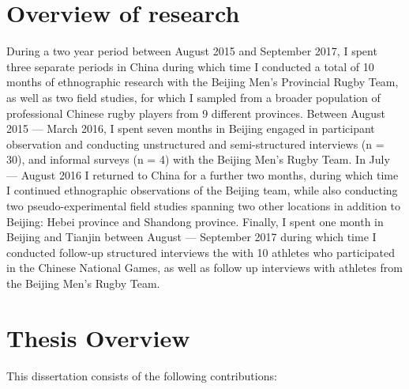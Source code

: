 \section{Overview of research}
During a two year period between August 2015 and September 2017, I spent three separate periods in China during which time I conducted a total of 10 months of ethnographic research with the Beijing Men's Provincial Rugby Team, as well as two field studies, for which I sampled from a broader population of professional Chinese rugby players from 9 different provinces.  Between August 2015 --- March 2016, I spent seven months in Beijing engaged in participant observation and conducting unstructured and semi-structured interviews (n = 30), and informal surveys (n = 4) with the Beijing Men's Rugby Team.  In July --- August 2016 I returned to China for a further two months, during which time I continued ethnographic observations of the Beijing team, while also conducting two pseudo-experimental field studies spanning two other locations in addition to Beijing: Hebei province and Shandong province.  Finally, I spent one month in Beijing and Tianjin between August --- September 2017 during which time I conducted follow-up structured interviews the with 10 athletes who participated in the Chinese National Games, as well as follow up interviews with athletes from the Beijing Men's Rugby Team.

\clearpage


\section{Thesis Overview}
This dissertation consists of the following contributions:

